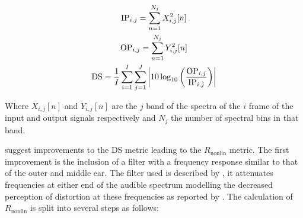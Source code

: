 			\begin{gather}
				\mathrm{IP}_{i,j} = \sum_{n = 1}^{N_{j}} X_{i,j}^{2}[n] \nonumber \\
				\mathrm{OP}_{i,j} = \sum_{n = 1}^{N_{j}} Y_{i,j}^{2}[n] \nonumber \\
				\mathrm{DS} = \frac{1}{I} \sum_{i = 1}^{I} \sum_{j = 1}^{J} 
					\left|10\log_{10} \left( \frac{\mathrm{OP}_{i,j}}{\mathrm{IP}_{i,j}} \right) \right|
				\label{eq:DistortionScore}
			\end{gather}

			Where $X_{i,j}[n]$ and $Y_{i,j}[n]$ are the $j$ band of the spectra of the $i$
			frame of the input and output signals respectively and $N_{j}$ the number of spectral bins in that
			band.
			
			\citet{tan2004predicting} suggest improvements to the $\mathrm{DS}$ metric leading to the
			$R_{\mathrm{nonlin}}$ metric. The first improvement is the inclusion of a filter with a frequency
			response similar to that of the outer and middle ear. The filter used is described by
			\citet{glasberg2002a}, it attenuates frequencies at either end of the audible spectrum modelling
			the decreased perception of distortion at these frequencies as reported by
			\citet{voishvillo2006assessment}. The calculation of $R_{\mathrm{nonlin}}$ is split into several
			steps as follows:
			
